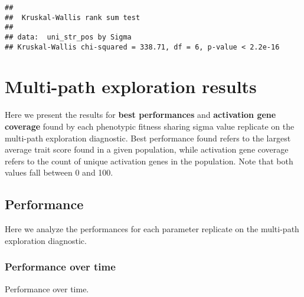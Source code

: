 \documentclass[]{book}
\newenvironment{Shaded}{\begin{snugshade}}{\end{snugshade}}
\newcommand{\DataTypeTok}[1]{\textcolor[rgb]{0.13,0.29,0.53}{#1}}
\newcommand{\KeywordTok}[1]{\textcolor[rgb]{0.13,0.29,0.53}{\textbf{#1}}}
\newcommand{\NormalTok}[1]{#1}
\newcommand{\OperatorTok}[1]{\textcolor[rgb]{0.81,0.36,0.00}{\textbf{#1}}}
\newcommand{\StringTok}[1]{\textcolor[rgb]{0.31,0.60,0.02}{#1}}
\begin{document}
\begin{verbatim}
## 
##  Kruskal-Wallis rank sum test
## 
## data:  uni_str_pos by Sigma
## Kruskal-Wallis chi-squared = 338.71, df = 6, p-value < 2.2e-16
\end{verbatim}

\hypertarget{multi-path-exploration-results-4}{%
\section{Multi-path exploration results}\label{multi-path-exploration-results-4}}

Here we present the results for \textbf{best performances} and \textbf{activation gene coverage} found by each phenotypic fitness sharing sigma value replicate on the multi-path exploration diagnostic.
Best performance found refers to the largest average trait score found in a given population, while activation gene coverage refers to the count of unique activation genes in the population.
Note that both values fall between 0 and 100.

\hypertarget{performance-8}{%
\subsection{Performance}\label{performance-8}}

Here we analyze the performances for each parameter replicate on the multi-path exploration diagnostic.

\hypertarget{performance-over-time-16}{%
\subsubsection{Performance over time}\label{performance-over-time-16}}

Performance over time.

\begin{Shaded}
\end{Shaded}
\end{document}
